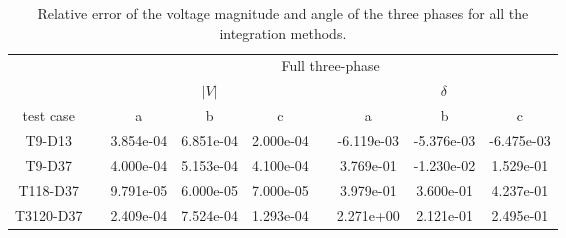 \begin{table}
\renewcommand{\arraystretch}{1.3}
\centering
\caption{Relative error of the voltage magnitude and angle of the three phases for all the integration methods. }\label{tab:relerror}
\begin{adjustbox}{width=1\textwidth} %
\small
\begin{tabular}{ccccccccc}
\toprule
{} && \multicolumn{7}{c}{Full three-phase}   \\
\cmidrule{3-9}
{} && \multicolumn{3}{c}{$|V|$} && \multicolumn{3}{c}{$\delta$}  \\
\cmidrule{3-5}\cmidrule{7-9}
 test case &&        a &        b &       c &&        a &       b &        c \\
\midrule
T9-D13    &&  3.854e-04 &  6.851e-04 &  2.000e-04 &&  -6.119e-03 &  -5.376e-03 &  -6.475e-03 \\
T9-D37    &&  4.000e-04 &  5.153e-04 &  4.100e-04 &&   3.769e-01 &  -1.230e-02 &   1.529e-01 \\
T118-D37  &&  9.791e-05 &  6.000e-05 &  7.000e-05 &&   3.979e-01 &   3.600e-01 &   4.237e-01 \\
T3120-D37 &&  2.409e-04 &  7.524e-04 &  1.293e-04 &&   2.271e+00 &   2.121e-01 &   2.495e-01 \\
\bottomrule
\end{tabular}
\end{adjustbox}


\end{table}
